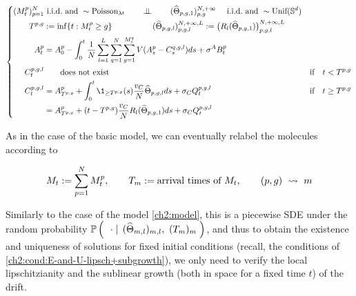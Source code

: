 \begin{equation}
	\left\{
	\begin{aligned}
		(\hmactive^p_t)_{p=1}^N 
		&\text{ \iid and } \sim \Pois_{\lambda t}
		\qquad\indep\qquad
		(\cgonia_{p,g,1})_{p,g}^{N,+\infty} \quad \text{ \iid and } \sim \Unf(\Sphere^d)
		&
		\\
		 \btime^{p,g} &:= \inf \{ t : \hmactive^p_t \geq g \}
		 \qquad\quad\qquad
		 (\cgonia_{p,g,l})_{p,g,l}^{N,+\infty, \NumCampRelease} := \big(\rotation_l (\cgonia_{p,g,1}) \big)_{p,g,l}^{N,+\infty, \NumCampRelease} 
		&
		\\
		\amba_t^p 
		&= \amba_0^p 
		- \int_0^t \frac{1}{N} \sum _{l = 1}^{\NumCampRelease} \sum _{q = 1}^{N} \sum_{g = 1}^{\hmactive_s^q} \attraction(\amba_s^p - \camp_s^{q,g,l}) d s
		+ \sigma^A B_t^p
		&
		\\
		\camp_t^{p,g,l} 
		&\qquad\text{does not exist} 
		&\text{if} \quad t < \btime^{p,g}
		\\
		\camp_t^{p,g,l}
		&= \amba_{\btime^{p,g}}^p + \int_{0}^t \1_{\geq \btime^{p,g}}(s)  \frac{\cdrift}{N}  \cgonia_{p,g,l} d s
		+\sigma_C \quasibm_t^{p,g,l}
		&\text{if} \quad t \geq \btime^{p,g}
		\\
		&= \amba_{\btime^{p,g}}^p + (t - \btime^{p,g})\frac{\cdrift}{N}  \rotation_l (\cgonia_{p,g,1}) d s 
		+\sigma_C \quasibm_t^{p,g,l}
			&
	\end{aligned}
	\right.
\end{equation}\label{ch7:model:pulsing-waves}

As in the case of the basic model, we can eventually relabel the molecules according to 

\begin{equation*}
	M_t := \sum_{p=1}^N M_t^p,
	\qquad
	T_m := \text{arrival times of $M_t$},
	\qquad
	(p,g)\ \rightsquigarrow\ m
\end{equation*}

Similarly to the case of the model \ref{ch2:model}, this is a piecewise SDE under the random probability $\PrbCond{\cdot}{(\cgonia_{m,l})_{m,l},\ (\btime_m)_m}$, and thus to obtain the existence and uniqueness of solutions for fixed initial conditions (recall, the conditions of \ref{ch2:cond:E-and-U-lipsch+subgrowth}), we only need to verify the local lipschitzianity and the sublinear growth (both in space for a fixed time $t$) of the drift.


